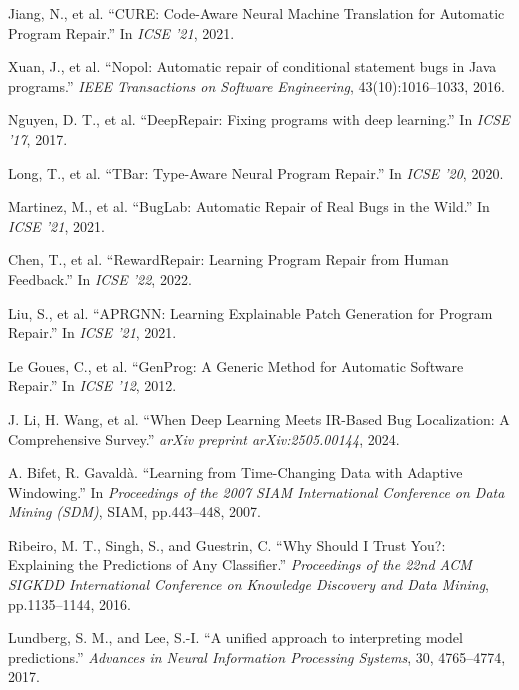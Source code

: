 \documentclass[manuscript,screen,review]{acmart}
\begin{document}
\begin{thebibliography}{99}
Jiang, N., et al. ``CURE: Code-Aware Neural Machine Translation for Automatic Program Repair.'' In \textit{ICSE '21}, 2021.

Xuan, J., et al. ``Nopol: Automatic repair of conditional statement bugs in Java programs.'' \textit{IEEE Transactions on Software Engineering}, 43(10):1016--1033, 2016.

Nguyen, D. T., et al. ``DeepRepair: Fixing programs with deep learning.'' In \textit{ICSE '17}, 2017.

Long, T., et al. ``TBar: Type-Aware Neural Program Repair.'' In \textit{ICSE '20}, 2020.

Martinez, M., et al. ``BugLab: Automatic Repair of Real Bugs in the Wild.'' In \textit{ICSE '21}, 2021.

Chen, T., et al. ``RewardRepair: Learning Program Repair from Human Feedback.'' In \textit{ICSE '22}, 2022.

Liu, S., et al. ``APRGNN: Learning Explainable Patch Generation for Program Repair.'' In \textit{ICSE '21}, 2021.

Le Goues, C., et al. ``GenProg: A Generic Method for Automatic Software Repair.'' In \textit{ICSE '12}, 2012.

J. Li, H. Wang, et al. ``When Deep Learning Meets IR-Based Bug Localization: A Comprehensive Survey.'' \textit{arXiv preprint arXiv:2505.00144}, 2024.

A. Bifet, R. Gavaldà. ``Learning from Time-Changing Data with Adaptive Windowing.'' In \textit{Proceedings of the 2007 SIAM International Conference on Data Mining (SDM)}, SIAM, pp.443--448, 2007.

Ribeiro, M. T., Singh, S., and Guestrin, C. ``Why Should I Trust You?: Explaining the Predictions of Any Classifier.'' \textit{Proceedings of the 22nd ACM SIGKDD International Conference on Knowledge Discovery and Data Mining}, pp.1135--1144, 2016.

Lundberg, S. M., and Lee, S.-I. ``A unified approach to interpreting model predictions.'' \textit{Advances in Neural Information Processing Systems}, 30, 4765--4774, 2017.

\end{thebibliography}
\end{document}
